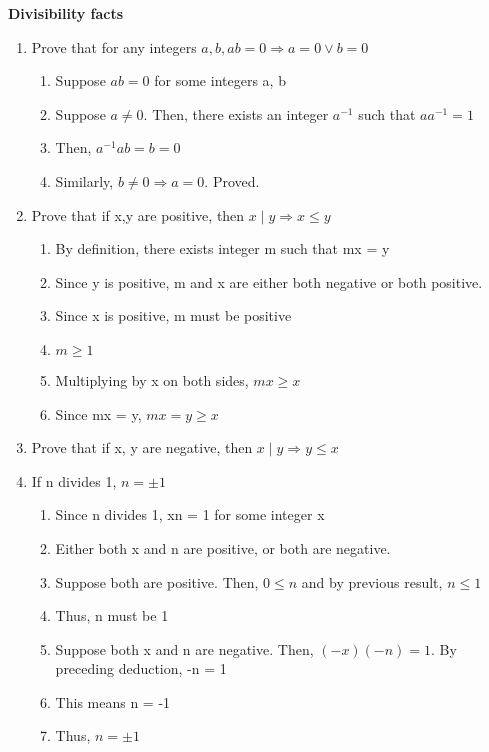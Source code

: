 \documentclass{article}
\begin{document}
\textbf{Divisibility facts}
\begin{enumerate}
\item Prove that for any  integers $ a, b, ab = 0 \Rightarrow a = 0 \lor b = 0 $

\begin{enumerate}
\item Suppose $ ab = 0 $ for some integers a, b
\item Suppose $ a \neq 0. $ Then, there exists an integer $ a^{-1} $ such that $aa^{-1} = 1 $
\item Then, $a^{-1} a b = b = 0 $
\item Similarly, $ b \neq 0 \Rightarrow a = 0 $. Proved.
\end{enumerate}

\item Prove that if x,y are positive, then $ x \mid y \Rightarrow x \leq y $
\begin{enumerate}
\item By definition, there exists integer m such that mx = y
\item Since y is positive, m and x are either both negative or both positive.
\item Since x is positive, m must be positive
\item $ m \geq 1 $
\item Multiplying by x on both sides, $ mx \geq x $
\item Since mx = y, $ mx = y \geq x $
\end{enumerate}

\item Prove that if x, y are negative, then $ x \mid y \Rightarrow y \leq x $

\item If n divides 1, $ n = \pm 1 $
\begin{enumerate}
\item Since n divides 1, xn = 1 for some integer x
\item Either both x and n are positive, or both are negative.
\item Suppose both are positive. Then, $ 0 \leq n $ and by previous result, $ n \leq 1 $
\item Thus, n must be 1
\item Suppose both x and n are negative. Then, $ (-x)(-n) = 1 $. By preceding
deduction, -n = 1
\item This means n = -1
\item Thus, $ n = \pm 1 $
\end{enumerate}


\end{enumerate}
\end{document}

